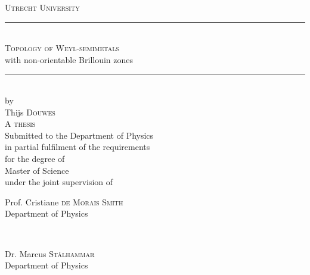 \documentclass[11pt,a4paper]{report}
\theoremstyle{definition}
\theoremstyle{remark}
\newcommand{\?}{\stackrel{?}{=}}
\begin{document}
	
\begin{titlepage} %
		\newcommand{\HRule}{\rule{\linewidth}{0.5mm}} %
		
		\center %
		
		
		\textsc{\LARGE Utrecht University}\\[1.5cm] %
		
		
		\HRule\\[0.4cm]
		
		{\Huge\textsc{Topology of Weyl-semimetals}\\[.2cm] \huge  with non-orientable Brillouin zones}\\[0.4cm] %
		
		\HRule\\[.8cm]
		
		
		{\large by}\\[.8cm]
		
		
		{\LARGE Thijs \textsc{Douwes}}\\[1.1cm]
		
		
		
		{\Large \textsc{A thesis}}\\[.8cm]
		
		
		{\large Submitted to the Department of Physics}\\[.1cm]
		{\large in partial fulfilment of the requirements}\\[.1cm]
		{\large for the degree of}\\[.5cm]
		
		{\Large Master of Science}\\[.9cm]
		
		
		{\large under the joint supervision of}\\[1cm]
		
		
		\begin{minipage}{0.45\textwidth}
			\begin{flushleft}
				\large
				Prof. Cristiane \textsc{de Morais Smith}\\
				\normalsize Department of Physics
			\end{flushleft}
		\end{minipage}
		~
		\begin{minipage}{0.45\textwidth}
			\begin{flushright}
				\large
				Dr. Marcus \textsc{St{\aa}lhammar}\\
				\normalsize Department of Physics
			\end{flushright}
		\end{minipage}
		

\end{titlepage}
\end{document}
